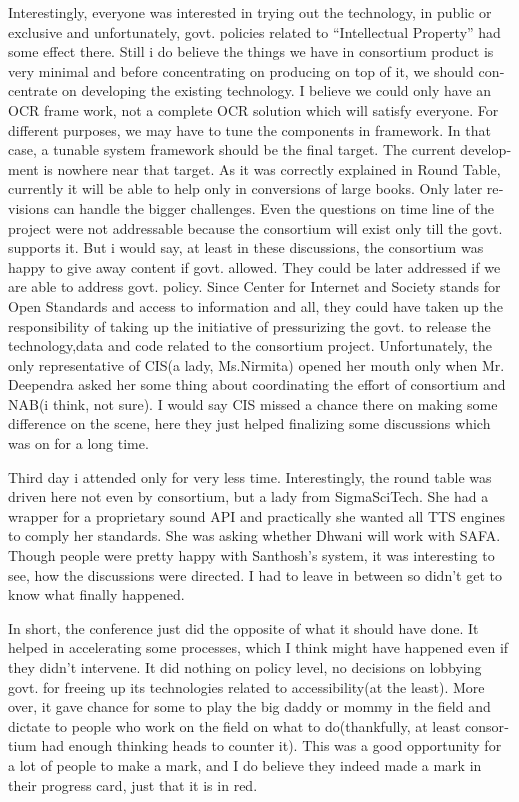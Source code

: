 \begin{english}
Interestingly, everyone was interested in trying out the technology, in public or exclusive and unfortunately, govt. policies related to “Intellectual Property” had some effect there. Still i do believe the things we have in consortium product is very minimal and before concentrating on producing on top of it, we should concentrate on developing the existing technology. I believe we could only have an OCR frame work, not a complete OCR solution which will satisfy everyone. For different purposes, we may have to tune the components in framework. In that case, a tunable system framework should be the final target. The current development is nowhere near that target. As it was correctly explained in Round Table, currently it will be able to help only in conversions of large books. Only later revisions can handle the bigger challenges. Even the questions on time line of the project were not addressable because the consortium will exist only till the govt. supports it. But i would say, at least in these discussions, the consortium was happy to give away content if govt. allowed. They could be later addressed if we are able to address govt. policy. Since Center for Internet and Society stands for Open Standards and access to information and all, they could have taken up the responsibility of taking up the initiative of pressurizing the govt. to release the technology,data and code related to the consortium project. Unfortunately, the only representative of CIS(a lady, Ms.Nirmita) opened her mouth only when Mr. Deependra asked her some thing about coordinating the effort of consortium and NAB(i think, not sure). I would say CIS missed a chance there on making some difference on the scene, here they just helped finalizing some discussions which was on for a long time.

Third day i attended only for very less time. Interestingly, the round table was driven here not even by consortium, but a lady from SigmaSciTech. She had a wrapper for a proprietary sound API and practically she wanted all TTS engines to comply her standards. She was asking whether Dhwani will work with SAFA. Though people were pretty happy with Santhosh’s system, it was interesting to see, how the discussions were directed. I had to leave in between so didn’t get to know what finally happened.

In short, the conference just did the opposite of what it should have done. It helped in accelerating some processes, which I think might have happened even if they didn’t intervene. It did nothing on policy level, no decisions on lobbying govt. for freeing up its technologies related to accessibility(at the least). More over, it gave chance for some to play the big daddy or mommy in the field and dictate to people who work on the field on what to do(thankfully, at least consortium had enough thinking heads to counter it). This was a good opportunity for a lot of people to make a mark, and I do believe they indeed made a mark in their progress card, just that it is in red.


\end{english}
